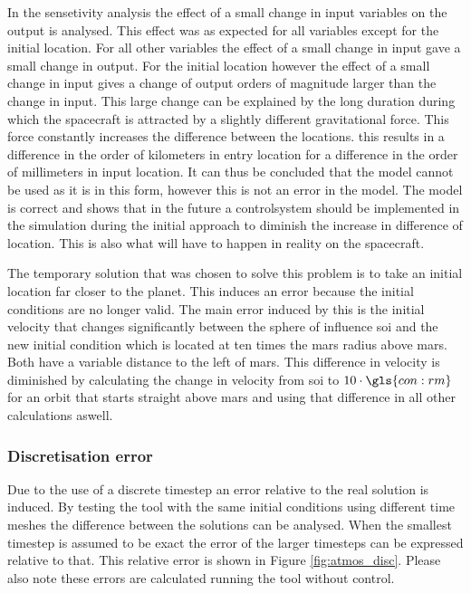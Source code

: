 In the sensetivity analysis the effect of a small change in input variables on the output is analysed. This effect was as expected for all variables except for the initial location. For all other variables the effect of a small change in input gave a small change in output. For the initial location however the effect of a small change in input gives a change of output orders of magnitude larger than the change in input. This large change can be explained by the long duration during which the spacecraft is attracted by a slightly different gravitational force. This force constantly increases the difference between the locations. this results in a difference in the order of kilometers in entry location for a difference in the order of millimeters in input location. It can thus be concluded that the model cannot be used as it is in this form, however this is not an error in the model. The model is correct and shows that in the future a controlsystem should be implemented in the simulation during the initial approach to diminish the increase in difference of location. This is also what will have to happen in reality on the spacecraft.

The temporary solution that was chosen to solve this problem is to take an initial location far closer to the planet. This induces an error because the initial conditions are no longer valid. The main error induced by this is the initial velocity that changes significantly between the sphere of influence \gls{soi} and the new initial condition which is located at ten times the mars radius above mars. Both have a variable distance to the left of mars. This difference in velocity is diminished by calculating the change in velocity from \gls{soi} to $10\cdot\gls{con:rm}$ for an orbit that starts straight above mars and using that difference in all other calculations aswell.

\subsubsection{Discretisation error}
\label{sec:astrodisc}

Due to the use of a discrete timestep an error relative to the real solution is induced. By testing the tool with the same initial conditions using different time meshes the difference between the solutions can be analysed. When the smallest timestep is assumed to be exact the error of the larger timesteps can be expressed relative to that. This relative error is shown in Figure \ref{fig:atmos_disc}. Please also note these errors are calculated running the tool without control.

